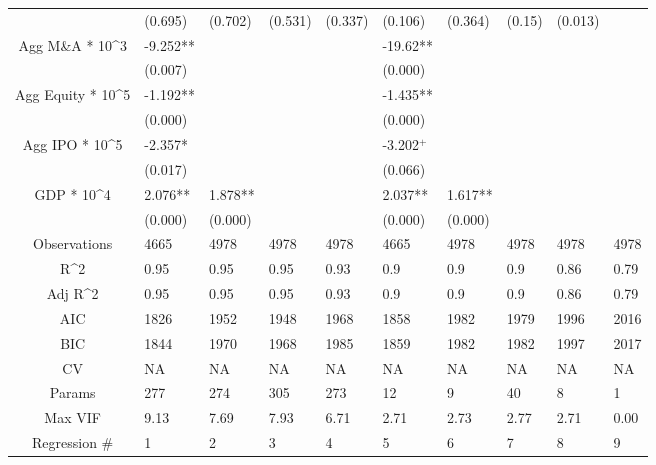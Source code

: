 \documentclass{article}
\begin{document}
\begin{table}[H]
\begin{tabular}{|clllllllll|}
   & (0.695) & (0.702) & (0.531) & (0.337) & (0.106) & (0.364) & (0.15) & (0.013) &  \\ 
  Agg M\&A * 10^3 & -9.252** &  &  &  & -19.62** &  &  &  &  \\ 
   & (0.007) &  &  &  & (0.000) &  &  &  &  \\ 
  Agg Equity * 10^5 & -1.192** &  &  &  & -1.435** &  &  &  &  \\ 
   & (0.000) &  &  &  & (0.000) &  &  &  &  \\ 
  Agg IPO * 10^5 & -2.357* &  &  &  & -3.202$^{+}$ &  &  &  &  \\ 
   & (0.017) &  &  &  & (0.066) &  &  &  &  \\ 
  GDP * 10^4 & 2.076** & 1.878** &  &  & 2.037** & 1.617** &  &  &  \\ 
   & (0.000) & (0.000) &  &  & (0.000) & (0.000) &  &  &  \\ 
  \hline 
 Observations & 4665 & 4978 & 4978 & 4978 & 4665 & 4978 & 4978 & 4978 & 4978 \\ 
  R^2 & 0.95 & 0.95 & 0.95 & 0.93 & 0.9 & 0.9 & 0.9 & 0.86 & 0.79 \\ 
  Adj R^2 & 0.95 & 0.95 & 0.95 & 0.93 & 0.9 & 0.9 & 0.9 & 0.86 & 0.79 \\ 
  AIC & 1826 & 1952 & 1948 & 1968 & 1858 & 1982 & 1979 & 1996 & 2016 \\ 
  BIC & 1844 & 1970 & 1968 & 1985 & 1859 & 1982 & 1982 & 1997 & 2017 \\ 
  CV & NA & NA & NA & NA & NA & NA & NA & NA & NA \\ 
  Params & 277 & 274 & 305 & 273 & 12 & 9 & 40 & 8 & 1 \\ 
  Max VIF & 9.13 & 7.69 & 7.93 & 6.71 & 2.71 & 2.73 & 2.77 & 2.71 & 0.00 \\ 
  Regression \# & 1 & 2 & 3 & 4 & 5 & 6 & 7 & 8 & 9 \\ 
   \hline
\end{tabular}
 
\end{table}
\end{document}
